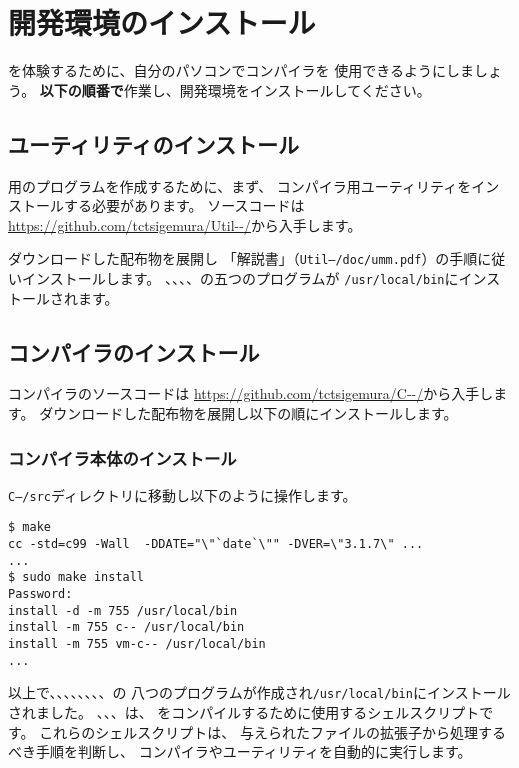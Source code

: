 % 
%
\chapter{\cmml 開発環境のインストール}

\cmml を体験するために、自分のパソコンで\cmm コンパイラを
使用できるようにしましょう。
{\bf 以下の順番で}作業し、開発環境をインストールしてください。


\section{ユーティリティのインストール}

{\tac}用のプログラムを作成するために、まず、
{\cmm}コンパイラ用ユーティリティをインストールする必要があります。
ソースコードは
\url{https://github.com/tctsigemura/Util--/}から入手します。

ダウンロードした配布物を展開し
「{\util}解説書」（{\tt Util--/doc/umm.pdf}）の手順に従いインストールします。
{\as}、{\ld}、{\objbin}、{\objexe}、{\size}の五つのプログラムが
{\tt /usr/local/bin}にインストールされます。

\section{コンパイラのインストール}
\label{chap2:compilerl}

{\cmm}コンパイラのソースコードは
\url{https://github.com/tctsigemura/C--/}から入手します。
ダウンロードした配布物を展開し以下の順にインストールします。

\subsection{コンパイラ本体のインストール}

{\tt C--/src}ディレクトリに移動し以下のように操作します。

\begin{mylist}
\begin{verbatim}
$ make
cc -std=c99 -Wall  -DDATE="\"`date`\"" -DVER=\"3.1.7\" ...
...
$ sudo make install
Password:
install -d -m 755 /usr/local/bin
install -m 755 c-- /usr/local/bin
install -m 755 vm-c-- /usr/local/bin
...
\end{verbatim}
\end{mylist}

以上で、{\cme}、{\cmc}、{\cmi}、{\cmv}、{\cmmc}、{\ccmmc}、{\icmmc}、{\vcmmc}の
八つのプログラムが作成され\verb;/usr/local/bin;にインストールされました。
{\cme}、{\cmc}、{\cmi}、{\cmv}は、
{\cmml}をコンパイルするために使用するシェルスクリプトです。
これらのシェルスクリプトは、
与えられたファイルの拡張子から処理するべき手順を判断し、
コンパイラやユーティリティを自動的に実行します。


